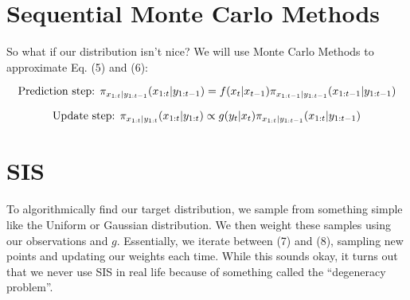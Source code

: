 \documentclass{article}
\begin{document}


\section{Sequential Monte Carlo Methods}

So what if our distribution isn't nice? We will use Monte Carlo Methods to approximate Eq. (5) and (6):

\begin{equation}
\textnormal{Prediction step:  }
\pi_{x_{1:t}|y_{1:t-1}}(x_{1:t}|y_{1:t-1})= f(x_t|x_{t-1}) \pi_{x_{1:t-1}|y_{1:t-1}}(x_{1:t-1}|y_{1:t-1})
\end{equation}

\begin{equation}
\textnormal{Update step:  }
\pi_{x_{1:t}|y_{1:t}}(x_{1:t}|y_{1:t})\propto g(y_t|x_t)\pi_{x_{1:t}|y_{1:t-1}}(x_{1:t}|y_{1:t-1})
\end{equation}

\section{SIS}

To algorithmically find our target distribution, we sample from something simple like the Uniform or Gaussian distribution. We then weight these samples using our observations and $g$. Essentially, we iterate between (7) and (8), sampling new points and updating our weights each time. While this sounds okay, it turns out that we never use SIS in real life because of something called the ``degeneracy problem''.

\end{document}
